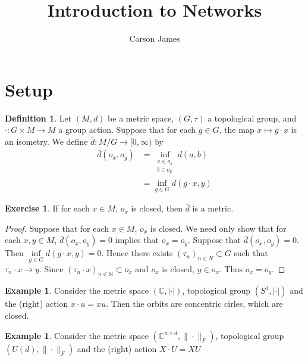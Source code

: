 \documentclass[12pt]{amsart}
\theoremstyle{definition}
\newtheorem{defn}[definition]{Definition}
\newtheorem{ex}[definition]{Exercise}
\newtheorem{exm}[definition]{Example}
\newcommand{\C}{\mathbb{C}}
\newcommand{\N}{\mathbb{N}}
\newcommand{\Rg}{[0,\infty)}
\begin{document}
	
	\title{Introduction to Networks}
	\author{Carson James}
	\maketitle
	
	\tableofcontents
	
	\section{Setup}
	\begin{defn}
	Let $(M, d)$ be a metric space, $(G, \tau)$ a topological group, and $\cdot: G \times M \rightarrow M$ a group action.  
	Suppose that for each $g \in G$, the map $x \mapsto g \cdot x$ is an isometry. We define 
	$\bar{d}: M / G \rightarrow \Rg$ by 
	\begin{align*}
	\bar{d}(o_x, o_y) 
	&= \inf_{\substack{a \in o_x \\ b \in o_y}} d(a,b) \\
	&= \inf_{g \in G} d(g \cdot x, y)
	\end{align*}
	
	\end{defn}
	
	
	
	\begin{ex}
	If for each $x \in M$, $o_x$ is closed, then $\bar{d}$ is a metric.
	\end{ex}
	
	\begin{proof}
	Suppose that for each $x \in M$, $o_x$ is closed. We need only show that for each $x,y \in M$, $\bar{d}(o_x , o_y) = 0$ implies that $o_x = o_y$. Suppose that $\bar{d}(o_x , o_y) = 0$. Then $\inf\limits_{ g \in G} d(g \cdot x, y) = 0$. Hence there exists $(\tau_n)_{n \in N} \subset G$ such that $\tau_n \cdot x \rightarrow y$. Since $(\tau_n \cdot x)_{n \in \N} \subset o_x$ and $o_x$ is closed, $y \in o_x$. Thus $o_x = o_y$. 
	\end{proof}
	
	\begin{exm}
	Consider the metric space $(\C, | \cdot |)$, topological group $(S^1, | \cdot |)$ and  the (right) action $x \cdot u = xu$. Then the orbits are concentric cirles, which are closed. 
	\end{exm}
	
	\begin{exm}
	Consider the metric space $(\C^{n \times d}, \|\cdot\|_F)$, topological group $(U(d), \|\cdot\|_F)$ and  the (right) action $X \cdot U = XU$
	\end{exm}
	
\end{document}
